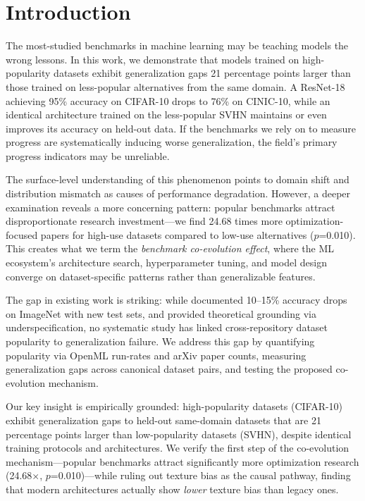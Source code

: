 \section{Introduction}

The most-studied benchmarks in machine learning may be teaching models the wrong lessons. In this work, we demonstrate that models trained on high-popularity datasets exhibit generalization gaps 21 percentage points larger than those trained on less-popular alternatives from the same domain. A ResNet-18 achieving 95\% accuracy on CIFAR-10 drops to 76\% on CINIC-10, while an identical architecture trained on the less-popular SVHN maintains or even improves its accuracy on held-out data. If the benchmarks we rely on to measure progress are systematically inducing worse generalization, the field's primary progress indicators may be unreliable.

The surface-level understanding of this phenomenon points to domain shift and distribution mismatch as causes of performance degradation. However, a deeper examination reveals a more concerning pattern: popular benchmarks attract disproportionate research investment---we find 24.68 times more optimization-focused papers for high-use datasets compared to low-use alternatives ($p$=0.010). This creates what we term the \emph{benchmark co-evolution effect}, where the ML ecosystem's architecture search, hyperparameter tuning, and model design converge on dataset-specific patterns rather than generalizable features.

The gap in existing work is striking: while \citet{recht2019imagenet} documented 10--15\% accuracy drops on ImageNet with new test sets, and \citet{damour2020underspecification} provided theoretical grounding via underspecification, no systematic study has linked cross-repository dataset popularity to generalization failure. We address this gap by quantifying popularity via OpenML run-rates and arXiv paper counts, measuring generalization gaps across canonical dataset pairs, and testing the proposed co-evolution mechanism.

Our key insight is empirically grounded: high-popularity datasets (CIFAR-10) exhibit generalization gaps to held-out same-domain datasets that are 21 percentage points larger than low-popularity datasets (SVHN), despite identical training protocols and architectures. We verify the first step of the co-evolution mechanism---popular benchmarks attract significantly more optimization research (24.68$\times$, $p$=0.010)---while ruling out texture bias as the causal pathway, finding that modern architectures actually show \emph{lower} texture bias than legacy ones.

